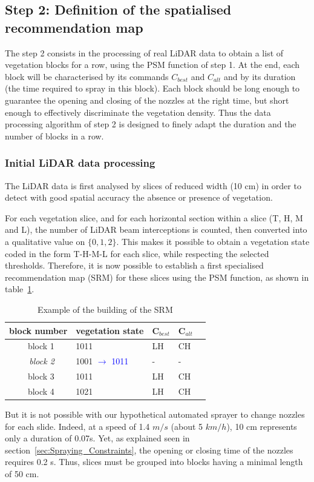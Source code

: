 \documentclass[preprint,3p,times,twocolumn]{elsarticle}
\begin{document}
\subsection{Step 2: Definition of the spatialised recommendation map}
\label{sec:step2}
The step 2 consists in the processing of real LiDAR data to obtain a list of vegetation blocks for a row, using the PSM function of step 1. At the end, each block will be characterised by its commands $ C_{best} $ and $ C_{alt} $ and by its duration (the time required to spray in this block). Each block should be long enough to guarantee the opening and closing of the nozzles at the right time, but short enough to effectively discriminate the vegetation density. Thus the data processing algorithm of step 2 is designed to finely adapt the duration and the number of blocks in a row.

\subsubsection{Initial LiDAR data processing}

The LiDAR data is first analysed by slices of reduced width (10 cm) in order to detect with good spatial accuracy the absence or presence of vegetation. 

For each vegetation slice, and for each horizontal section within a slice (T, H, M and L), the number of LiDAR beam interceptions is counted, then converted into a qualitative value on $\{0, 1, 2\}$. This makes it possible to obtain a vegetation state coded in the form T-H-M-L for each slice, while respecting the selected thresholds. Therefore, it is now possible to establish a first specialised recommendation map (SRM) for these slices using the PSM function, as shown in table~\ref{tab:SRM}.

\begin{table}[ht]
\centering
\begin{tabular}{rl|l|l|l|c}
	\multicolumn{2}{c}{\textbf{block number}} & \textbf{vegetation state} & \textbf{C$_{best}$} & \textbf{C$_{alt}$}  \\ \hline
	block 1 & & 1011 & LH	& CH \\
	\textit{block 2 }&& 1001 \textcolor{blue}{$\rightarrow$ 1011} & -   & - \\
	block 3 && 1011 & LH	& CH \\
	block 4 & & 1021 & LH & CH\\
\end{tabular}
\caption{Example of the building of the SRM}
\label{tab:SRM}
\end{table}
But it is not possible with our hypothetical automated sprayer to change nozzles for each slide. Indeed, at a speed of 1.4 $m/s$ (about 5 $km/h$), 10 cm represents only a duration of 0.07s. Yet, as explained seen in section~\ref{sec:Spraying_Constraints}, the opening or closing time of the nozzles requires 0.2 s. Thus, slices must be grouped into blocks having a minimal length of 50 cm. 
\end{document}
